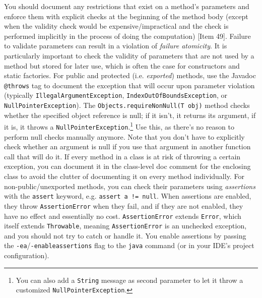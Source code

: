 \documentclass[table, xcdraw]{article}%
\begin{document}
You should document any restrictions that exist on a method's parameters and enforce them with explicit checks at the beginning of the method body (except when the validity check would be expensive/impractical and the check is performed implicitly in the process of doing the computation) [Item 49]. Failure to validate parameters can result in a violation of \emph{failure atomicity}. It is particularly important to check the validity of parameters that are not used by a method but stored for later use, which is often the case for constructors and static factories. For public and protected (i.e. \emph{exported}) methods, use the Javadoc \texttt{@throws} tag to document the exception that will occur upon parameter violation (typically \texttt{IllegalArgumentException}, \texttt{IndexOutOfBoundsException}, or \texttt{NullPointerException}). The \texttt{Objects.requireNonNull(T obj)} method checks whether the specified object reference is null; if it isn't, it returns its argument, if it is, it throws a \texttt{NullPointerException}.\footnote{You can also add a \texttt{String} message as second parameter to let it throw a customized \texttt{NullPointerException}.} Use this, as there’s no reason to perform null checks manually anymore. Note that you don't have to explicitly check whether an argument is null if you use that argument in another function call that will do it. If every method in a class is at risk of throwing a certain exception, you can document it in the class-level doc comment for the enclosing class to avoid the clutter of documenting it on every method individually. For non-public/unexported methods, you can check their parameters using \emph{assertions} with the \texttt{assert} keyword, e.g. \texttt{assert a != null}. When assertions are enabled, they throw \texttt{AssertionError} when they fail, and if they are not enabled, they have no effect and essentially no cost. \texttt{AssertionError} extends \texttt{Error}, which itself extends \texttt{Throwable}, meaning \texttt{AssertionError} is an unchecked exception, and you should not try to catch or handle it. You enable assertions by passing the \texttt{-ea}/\texttt{-enableassertions} flag to the \texttt{java} command (or in your IDE's project configuration).
\end{document}
